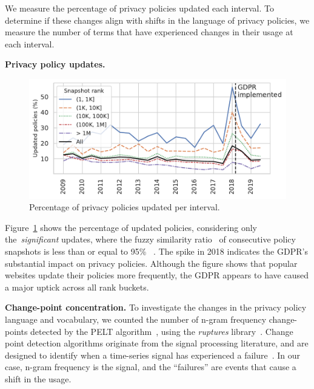 We measure the percentage of privacy policies updated each interval.
To determine if these changes align with shifts in the language of privacy policies, we measure the number of terms that have experienced changes in their usage at each interval.

\textbf{Privacy policy updates.}
\label{sec:policy-updates}
\begin{figure}[]
\centering
\includegraphics[width=0.99\columnwidth]{figures/policy-updates.pdf}
\caption[Caption]{Percentage of privacy policies updated per interval.\protect\footnotemark}
\label{fig:pct-policy-update}
\end{figure}
Figure~\ref{fig:pct-policy-update} shows the percentage of updated policies, considering
only the~\emph{significant} updates, where the fuzzy similarity ratio~\cite{fuzzywuzzy} of consecutive policy snapshots is less than or equal to 95\%
~\cite{linden2020privacy}.
The spike in 2018 indicates the GDPR's substantial impact on privacy policies.  Although the figure shows that
popular websites update their policies more frequently,
the GDPR appears to have caused a major uptick across all rank buckets. 





\textbf{Change-point concentration.} 
To 
investigate the changes in the privacy policy language and vocabulary,
we counted the number of n-gram frequency change-points detected by the PELT algorithm~\cite{killick2012optimal}, using the \textit{ruptures} library~\cite{ruptures}. Change point detection algorithms originate from the signal processing literature, and are designed to identify when a time-series signal has experienced a failure~\cite{picard1985testing}. In our case, n-gram frequency is the signal, and the ``failures'' are events that cause a shift in the usage.


